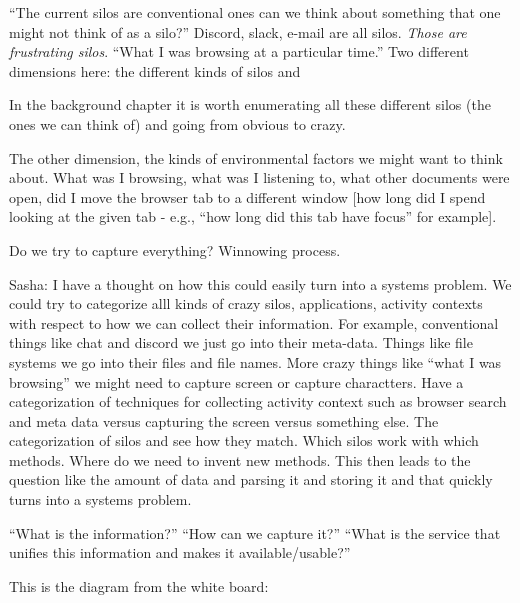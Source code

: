 \begin{itemize}
               ``The current silos are conventional ones can we think about
          something that one might not think of as a silo?''  Discord, slack, e-mail
          are all silos.  \emph{Those are frustrating silos}. ``What I was browsing at
          a particular time.''  Two different dimensions here: the different kinds of
          silos and

          In the background chapter it is worth enumerating all these different silos
          (the ones we can think of) and going from obvious to crazy.

          The other dimension, the kinds of environmental factors we might want to
          think about.  What was I browsing, what was I listening to, what other
          documents were open, did I move the browser tab to a different window [how
                  long did I spend looking at the given tab - e.g., ``how long did this tab
                  have focus'' for example].

          Do we try to capture everything?  Winnowing process.

          Sasha: I have a thought on how this could easily turn into a systems
          problem.  We could try to categorize alll kinds of crazy silos,
          applications, activity contexts with respect to how we can collect their
          information.  For example, conventional things like chat and discord we just
          go into their meta-data.  Things like file systems we go into their files
          and file names.  More crazy things like ``what I was browsing'' we might
          need to capture screen or capture charactters.  Have a categorization of
          techniques for collecting activity context such as browser search and meta
          data versus capturing the screen versus something else. The categorization
          of silos and see how they match.  Which silos work with which methods.
          Where do we need to invent new methods.  This then leads to the question
          like the amount of data and parsing it and storing it and that quickly turns
          into a systems problem.

          ``What is the information?''
          ``How can we capture it?''
          ``What is the service that unifies this information and makes it
          available/usable?''



\end{itemize}

This is the diagram from the white board:


